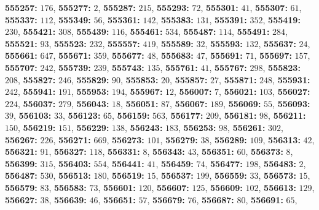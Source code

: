 \textsf{\bfseries 555257:} $176$, \textsf{\bfseries 555277:} $2$, \textsf{\bfseries 555287:} $215$, \textsf{\bfseries 555293:} $72$, \textsf{\bfseries 555301:} $41$, \textsf{\bfseries 555307:} $61$, \textsf{\bfseries 555337:} $112$, \textsf{\bfseries 555349:} $56$, \textsf{\bfseries 555361:} $142$, \textsf{\bfseries 555383:} $131$, \textsf{\bfseries 555391:} $352$, \textsf{\bfseries 555419:} $230$, \textsf{\bfseries 555421:} $308$, \textsf{\bfseries 555439:} $116$, \textsf{\bfseries 555461:} $534$, \textsf{\bfseries 555487:} $114$, \textsf{\bfseries 555491:} $284$, \textsf{\bfseries 555521:} $93$, \textsf{\bfseries 555523:} $232$, \textsf{\bfseries 555557:} $419$, \textsf{\bfseries 555589:} $32$, \textsf{\bfseries 555593:} $132$, \textsf{\bfseries 555637:} $24$, \textsf{\bfseries 555661:} $647$, \textsf{\bfseries 555671:} $359$, \textsf{\bfseries 555677:} $48$, \textsf{\bfseries 555683:} $47$, \textsf{\bfseries 555691:} $71$, \textsf{\bfseries 555697:} $157$, \textsf{\bfseries 555707:} $242$, \textsf{\bfseries 555739:} $239$, \textsf{\bfseries 555743:} $135$, \textsf{\bfseries 555761:} $41$, \textsf{\bfseries 555767:} $298$, \textsf{\bfseries 555823:} $208$, \textsf{\bfseries 555827:} $246$, \textsf{\bfseries 555829:} $90$, \textsf{\bfseries 555853:} $20$, \textsf{\bfseries 555857:} $27$, \textsf{\bfseries 555871:} $248$, \textsf{\bfseries 555931:} $242$, \textsf{\bfseries 555941:} $191$, \textsf{\bfseries 555953:} $194$, \textsf{\bfseries 555967:} $12$, \textsf{\bfseries 556007:} $7$, \textsf{\bfseries 556021:} $103$, \textsf{\bfseries 556027:} $224$, \textsf{\bfseries 556037:} $279$, \textsf{\bfseries 556043:} $18$, \textsf{\bfseries 556051:} $87$, \textsf{\bfseries 556067:} $189$, \textsf{\bfseries 556069:} $55$, \textsf{\bfseries 556093:} $39$, \textsf{\bfseries 556103:} $33$, \textsf{\bfseries 556123:} $65$, \textsf{\bfseries 556159:} $563$, \textsf{\bfseries 556177:} $209$, \textsf{\bfseries 556181:} $98$, \textsf{\bfseries 556211:} $150$, \textsf{\bfseries 556219:} $151$, \textsf{\bfseries 556229:} $138$, \textsf{\bfseries 556243:} $183$, \textsf{\bfseries 556253:} $98$, \textsf{\bfseries 556261:} $302$, \textsf{\bfseries 556267:} $226$, \textsf{\bfseries 556271:} $669$, \textsf{\bfseries 556273:} $101$, \textsf{\bfseries 556279:} $38$, \textsf{\bfseries 556289:} $109$, \textsf{\bfseries 556313:} $42$, \textsf{\bfseries 556321:} $91$, \textsf{\bfseries 556327:} $118$, \textsf{\bfseries 556331:} $8$, \textsf{\bfseries 556343:} $43$, \textsf{\bfseries 556351:} $60$, \textsf{\bfseries 556373:} $8$, \textsf{\bfseries 556399:} $315$, \textsf{\bfseries 556403:} $554$, \textsf{\bfseries 556441:} $41$, \textsf{\bfseries 556459:} $74$, \textsf{\bfseries 556477:} $198$, \textsf{\bfseries 556483:} $2$, \textsf{\bfseries 556487:} $530$, \textsf{\bfseries 556513:} $180$, \textsf{\bfseries 556519:} $15$, \textsf{\bfseries 556537:} $199$, \textsf{\bfseries 556559:} $33$, \textsf{\bfseries 556573:} $15$, \textsf{\bfseries 556579:} $83$, \textsf{\bfseries 556583:} $73$, \textsf{\bfseries 556601:} $120$, \textsf{\bfseries 556607:} $125$, \textsf{\bfseries 556609:} $102$, \textsf{\bfseries 556613:} $129$, \textsf{\bfseries 556627:} $38$, \textsf{\bfseries 556639:} $46$, \textsf{\bfseries 556651:} $57$, \textsf{\bfseries 556679:} $76$, \textsf{\bfseries 556687:} $80$, \textsf{\bfseries 556691:} $65$, 
